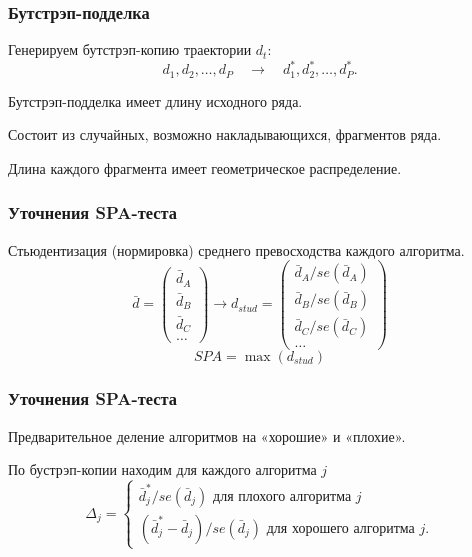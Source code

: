 \begin{frame}
    \frametitle{Бутстрэп-подделка}

    Генерируем \alert{бутстрэп-копию} траектории $d_t$: 
        \[
        d_1, d_2, \ldots, d_P  \quad \to \quad     d_1^*, d_2^*, \ldots, d_P^*.
        \] \pause
    
    Бутстрэп-подделка имеет длину исходного ряда.\pause 

    Состоит из случайных, возможно накладывающихся, \alert{фрагментов} ряда. \pause 

    Длина каждого фрагмента имеет \alert{геометрическое} распределение. 
\end{frame}




\begin{frame}
    \frametitle{Уточнения SPA-теста}


    \alert{Стьюдентизация} (нормировка) среднего превосходства каждого алгоритма. 
        \[
        \bar d = \begin{pmatrix}
            \bar d_A \\
            \bar d_B \\
            \bar d_C \\
            \ldots 
        \end{pmatrix}     \to 
        d_{stud} = \begin{pmatrix}
            \bar d_A / se(\bar d_A) \\
            \bar d_B / se(\bar d_B) \\
            \bar d_C / se(\bar d_C) \\
            \ldots 
        \end{pmatrix}        
        \] \pause
        \[
        SPA = \max(d_{stud})    
        \]
\end{frame}


\begin{frame}
    \frametitle{Уточнения SPA-теста}

    \alert{Предварительное деление} алгоритмов на «хорошие» и «плохие». \pause

    По бустрэп-копии находим для каждого алгоритма $j$
    \[
        \Delta_j = \begin{cases}
            \bar d^*_j / se(\bar d_j) \text{ для плохого алгоритма } j\\
            (\bar d^*_j - \bar d_j)/ se(\bar d_j) \text{ для хорошего алгоритма }j.
        \end{cases}
    \]
\end{frame}



